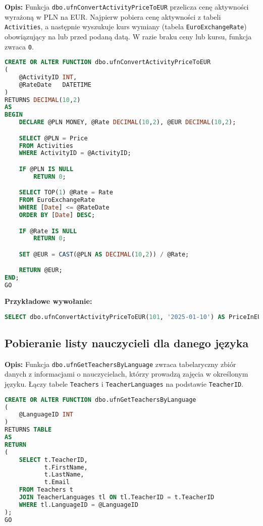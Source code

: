 \documentclass[12pt]{article}
\begin{document}
\textbf{Opis:} Funkcja \texttt{dbo.ufnConvertActivityPriceToEUR} przelicza cenę aktywności wyrażoną w PLN na EUR. Najpierw pobiera cenę aktywności z tabeli \texttt{Activities}, a następnie wyszukuje kurs wymiany (tabela \texttt{EuroExchangeRate}) obowiązujący na lub przed podaną datą. W razie braku ceny lub kursu, funkcja zwraca \texttt{0}.

 
\begin{lstlisting}[language=SQL]
CREATE OR ALTER FUNCTION dbo.ufnConvertActivityPriceToEUR
(
    @ActivityID INT,
    @RateDate   DATETIME
)
RETURNS DECIMAL(10,2)
AS
BEGIN
    DECLARE @PLN MONEY, @Rate DECIMAL(10,2), @EUR DECIMAL(10,2);

    SELECT @PLN = Price 
    FROM Activities
    WHERE ActivityID = @ActivityID;

    IF @PLN IS NULL
        RETURN 0;

    SELECT TOP(1) @Rate = Rate
    FROM EuroExchangeRate
    WHERE [Date] <= @RateDate
    ORDER BY [Date] DESC; 

    IF @Rate IS NULL
        RETURN 0;

    SET @EUR = CAST(@PLN AS DECIMAL(10,2)) / @Rate;

    RETURN @EUR;
END;
GO
\end{lstlisting}

\textbf{Przykładowe wywołanie:}
\begin{lstlisting}[language=SQL]
SELECT dbo.ufnConvertActivityPriceToEUR(101, '2025-01-10') AS PriceInEUR;
\end{lstlisting}
\newpage
\subsection{Pobieranie listy nauczycieli dla danego języka}
\label{sec:teachers_by_language}

\textbf{Opis:} Funkcja \texttt{dbo.ufnGetTeachersByLanguage} zwraca tabelaryczny zbiór danych z informacjami o nauczycielach, którzy prowadzą zajęcia w określonym języku. Łączy tabele \texttt{Teachers} i \texttt{TeacherLanguages} na podstawie \texttt{TeacherID}.

 
\begin{lstlisting}[language=SQL]
CREATE OR ALTER FUNCTION dbo.ufnGetTeachersByLanguage
(
    @LanguageID INT
)
RETURNS TABLE
AS
RETURN
(
    SELECT t.TeacherID,
           t.FirstName,
           t.LastName,
           t.Email
    FROM Teachers t
    JOIN TeacherLanguages tl ON tl.TeacherID = t.TeacherID
    WHERE tl.LanguageID = @LanguageID
);
GO
\end{lstlisting}
\end{document}
